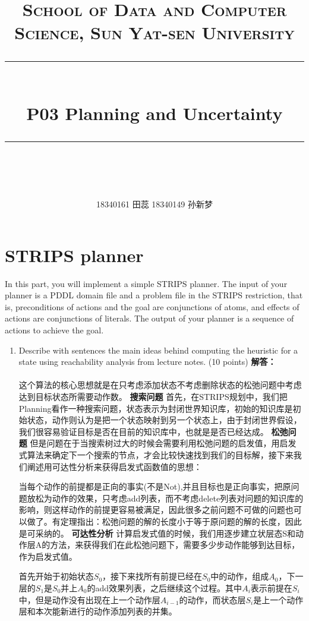 \documentclass[a4paper, 11pt]{article}
\title{	
\normalfont \normalsize
\textsc{School of Data and Computer Science, Sun Yat-sen University} \\ [25pt] %
\rule{\textwidth}{0.5pt} \\[0.4cm] %
\huge  P03 Planning and Uncertainty\\ %
\rule{\textwidth}{2pt} \\[0.5cm] %
\author{18340161 田蕊 18340149 孙新梦}
}
\begin{document}
\maketitle
\tableofcontents
\newpage
\section{STRIPS planner}
In this part, you will implement a simple STRIPS planner. The input of your planner is a PDDL domain file and a problem file in the STRIPS restriction, that is, preconditions of actions and the goal are conjunctions of atoms, and effects of actions are conjunctions of literals. The output of your planner is a sequence of actions to achieve the goal.

\begin{enumerate}

\item Describe with sentences the main ideas behind computing the heuristic for a state using reachability analysis from lecture notes. (10 points)
\textbf{解答：}
	\paragraph{}
	这个算法的核心思想就是在只考虑添加状态不考虑删除状态的松弛问题中考虑达到目标状态所需要动作数。
	\textbf{搜索问题}
    首先，在STRIPS规划中，我们把Planning看作一种搜索问题，状态表示为封闭世界知识库，初始的知识库是初始状态，动作则认为是把一个状态映射到另一个状态上，由于封闭世界假设，我们很容易验证目标是否在目前的知识库中，也就是是否已经达成。
    \textbf{松弛问题}
    但是问题在于当搜索树过大的时候会需要利用松弛问题的启发值，用启发式算法来确定下一个搜索的节点，才会比较快速找到我们的目标解，接下来我们阐述用可达性分析来获得启发式函数值的思想：
    
    当每个动作的前提都是正向的事实(不是Not),并且目标也是正向事实，把原问题放松为动作的效果，只考虑add列表，而不考虑delete列表对问题的知识库的影响，则这样动作的前提更容易被满足，因此很多之前问题不可做的问题也可以做了。有定理指出：松弛问题的解的长度小于等于原问题的解的长度，因此是可采纳的。
    \textbf{可达性分析}
    计算启发式值的时候，我们用逐步建立状层态S和动作层A的方法，来获得我们在此松弛问题下，需要多少步动作能够到达目标，作为启发式值。
    
    首先开始于初始状态$S_0$，接下来找所有前提已经在$S_0$中的动作，组成$A_0$，下一层的$S_1$是$S_0$并上$A_0$的add效果列表，之后继续这个过程。其中$A_i$表示前提在$S_i$中，但是动作没有出现在上一个动作层$A_{i-1}$的动作，而状态层$S_i$是上一个动作层和本次能新进行的动作添加列表的并集。
    

\end{enumerate}
\end{document}
